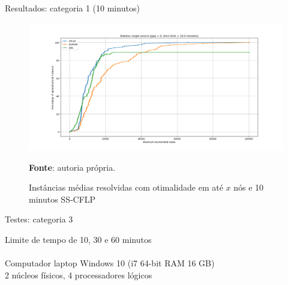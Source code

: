 \documentclass[aspectratio=169]{beamer}
\begin{document}
	\begin{frame}{Resultados: categoria 1 (10 minutos)} %
		
		\begin{figure}[H]
			\begin{center}
				\caption{Instâncias médias resolvidas com otimalidade em até $x$ nós e 10 minutos SS-CFLP \cite{Sobolev}}
				
				\includegraphics[height=0.6\textheight]{res/Sobolev SS 600 - Optimal x Nodes.png}
				\label{Opt:n:SS:Sobolev:600}
				
				\textbf{Fonte}: autoria própria.
			\end{center}
		\end{figure}
		
	\end{frame}
	
	\begin{frame}{Testes: categoria 3}
		
		
		Limite de tempo de 10, 30 e 60 minutos
		\\ \hfill \\
		Computador laptop Windows 10 (i7 64-bit RAM 16 GB)				
		\\ 2 núcleos físicos, 4 processadores lógicos
		
			
	\end{frame}
\end{document}
